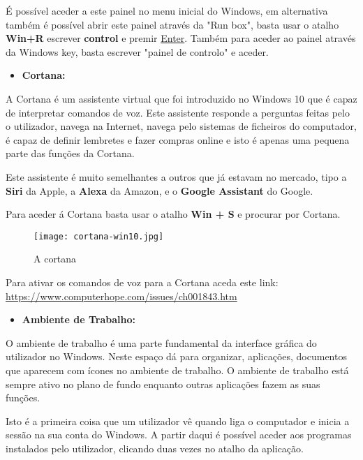 \documentclass{report}
\begin{document}
\vspace{5mm}

É possível aceder a este painel no menu inicial do Windows, em alternativa também é possível abrir este painel através da "Run box", basta usar o atalho \textbf{Win+R} escrever \textbf{control} e premir \underline{Enter}. Também para aceder ao painel através da Windows key, basta escrever "painel de controlo" e aceder.

\begin{itemize}
    \item \textbf{Cortana:}
\end{itemize}

A Cortana é um assistente virtual que foi introduzido no Windows 10 que é capaz de interpretar comandos de voz. Este assistente responde a perguntas feitas pelo o utilizador, navega na Internet, navega pelo sistemas de ficheiros do computador, é capaz de definir lembretes e fazer compras online e isto é apenas uma pequena parte das funções da Cortana.

Este assistente é muito semelhantes a outros que já estavam no mercado, tipo a \textbf{Siri} da Apple, a \textbf{Alexa} da Amazon, e o \textbf{Google Assistant} do Google.

\vspace{10mm}

Para aceder á Cortana basta usar o atalho \textbf{Win + S} e procurar por Cortana.

\begin{figure}[h!]
\texttt{[image: cortana-win10.jpg]}
\centering
\caption{A cortana}
\end{figure}

Para ativar os comandos de voz para a Cortana aceda este link: \url{https://www.computerhope.com/issues/ch001843.htm}

\vspace{35mm}

\begin{itemize}
    \item \textbf{Ambiente de Trabalho:}
\end{itemize}

O ambiente de trabalho é uma parte fundamental da interface gráfica do utilizador no Windows. Neste espaço dá para organizar, aplicações, documentos que aparecem com ícones no ambiente de trabalho. O ambiente de trabalho está sempre ativo no plano de fundo enquanto outras aplicações fazem as suas funções.

Isto é a primeira coisa que um utilizador vê quando liga o computador e inicia a sessão na sua conta do Windows. A partir daqui é possível aceder aos programas instalados pelo utilizador, clicando duas vezes no atalho da aplicação.
\end{document}
